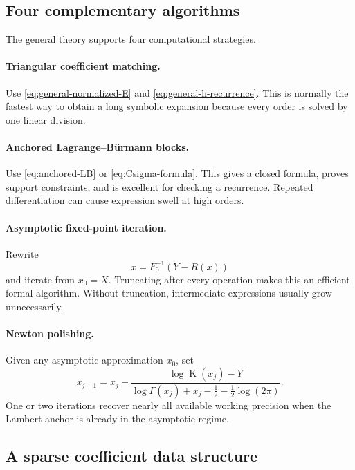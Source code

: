 \documentclass[11pt,oneside]{article}
\theoremstyle{plain}
\theoremstyle{definition}
\theoremstyle{remark}
\newcommand{\Kfun}{\operatorname{K}}
\begin{document}
\subsection{Four complementary algorithms}

The general theory supports four computational strategies.

\paragraph{Triangular coefficient matching.}
Use \eqref{eq:general-normalized-E} and
\eqref{eq:general-h-recurrence}.  This is normally the fastest way to obtain a
long symbolic expansion because every order is solved by one linear division.

\paragraph{Anchored Lagrange--B\"urmann blocks.}
Use \eqref{eq:anchored-LB} or \eqref{eq:Csigma-formula}.  This gives a closed
formula, proves support constraints, and is excellent for checking a
recurrence.  Repeated differentiation can cause expression swell at high
orders.

\paragraph{Asymptotic fixed-point iteration.}
Rewrite
\[
 x=F_0^{-1}(Y-R(x))
\]
and iterate from \(x_0=X\).  Truncating after every operation makes this an
efficient formal algorithm.  Without truncation, intermediate expressions
usually grow unnecessarily.

\paragraph{Newton polishing.}
Given any asymptotic approximation \(x_0\), set
\begin{equation}
 x_{j+1}=x_j-\frac{\log\Kfun(x_j)-Y}
 {\log\Gamma(x_j)+x_j-\tfrac12-\tfrac12\log(2\pi)}.
 \label{eq:K-Newton}
\end{equation}
One or two iterations recover nearly all available working precision when the
Lambert anchor is already in the asymptotic regime.

\subsection{A sparse coefficient data structure}
\end{document}

